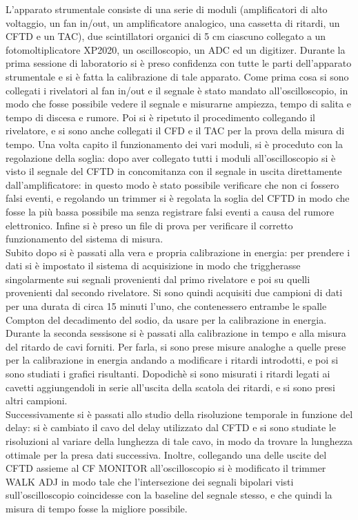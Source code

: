 L'apparato strumentale consiste di una serie di moduli (amplificatori di alto voltaggio, un fan in/out, un amplificatore analogico, una cassetta di ritardi, un CFTD e un TAC),
due scintillatori organici di 5 cm ciascuno collegato a un fotomoltiplicatore XP2020,  un oscilloscopio, un ADC ed un digitizer.
Durante la prima sessione di laboratorio si è preso confidenza con tutte le parti dell'apparato
strumentale e si è fatta la calibrazione di tale apparato. Come prima cosa si sono collegati i rivelatori al fan in/out e il segnale è stato mandato all'oscilloscopio,
in modo che fosse possibile vedere il segnale e misurarne ampiezza, tempo di salita e tempo di discesa e rumore. Poi si è ripetuto il procedimento collegando il rivelatore, e si
sono anche collegati il CFD e il TAC per la prova della misura di tempo. Una volta capito il funzionamento dei vari moduli, si è proceduto con la regolazione della soglia:
dopo aver collegato tutti i moduli all'oscilloscopio si è visto il segnale del CFTD in concomitanza con il segnale in uscita direttamente dall'amplificatore: in
questo modo è stato possibile verificare che non ci fossero falsi eventi, e regolando un trimmer si è regolata la soglia del CFTD in modo che fosse la più bassa possibile
ma senza registrare falsi eventi a causa del rumore elettronico. Infine si è preso un file di prova per verificare il corretto funzionamento del sistema di misura.\\

Subito dopo si è passati alla vera e propria calibrazione in energia: per prendere i dati si è impostato il sistema di acquisizione in modo che triggherasse singolarmente
sui segnali provenienti dal primo rivelatore e poi su quelli provenienti dal secondo rivelatore. Si sono quindi acquisiti due campioni di dati per una durata di circa 
15 minuti l'uno, che
contenessero entrambe le spalle Compton del decadimento del sodio, da usare per la calibrazione in energia.\\

Durante la seconda sessisone si è passati alla calibrazione in tempo e alla misura del ritardo de cavi forniti. Per farla, si sono prese misure analoghe a quelle prese per la calibrazione in
energia andando a modificare i ritardi introdotti, e poi si sono studiati i grafici risultanti. Dopodichè si sono misurati i ritardi legati ai cavetti aggiungendoli
in serie all'uscita della scatola dei ritardi, e si sono presi altri campioni.\\

Successivamente si è passati allo studio della risoluzione temporale in funzione del delay: si è cambiato il cavo del delay utilizzato dal CFTD e si sono studiate le
risoluzioni al variare della lunghezza di tale cavo, in modo da trovare la lunghezza ottimale per la presa dati successiva. Inoltre, collegando una delle uscite del
CFTD assieme al CF MONITOR all'oscilloscopio si è modificato il trimmer WALK ADJ in modo tale che l'intersezione dei segnali bipolari visti sull'oscilloscopio
coincidesse con la baseline del segnale stesso, e che quindi la misura di tempo fosse la migliore possibile.\\

